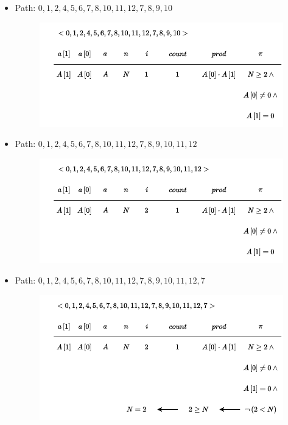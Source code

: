 \begin{itemize}
    \item Path: $0, 1, 2, 4, 5, 6, 7, 8, 10, 11, 12, 7, 8, 9, 10$
    \begin{figure}[!htp]
        \centering
        \includegraphics[width=.8\textwidth]{img/symbolic-execution-12.pdf}
    \end{figure}

    \item Path: $0, 1, 2, 4, 5, 6, 7, 8, 10, 11, 12, 7, 8, 9, 10, 11, 12$
    \begin{figure}[!htp]
        \centering
        \includegraphics[width=.8\textwidth]{img/symbolic-execution-13.pdf}
    \end{figure}

    \item Path: $0, 1, 2, 4, 5, 6, 7, 8, 10, 11, 12, 7, 8, 9, 10, 11, 12, 7$
    \begin{figure}[!htp]
        \centering
        \includegraphics[width=.8\textwidth]{img/symbolic-execution-14.pdf}
    \end{figure}

    \newpage


\end{itemize}
